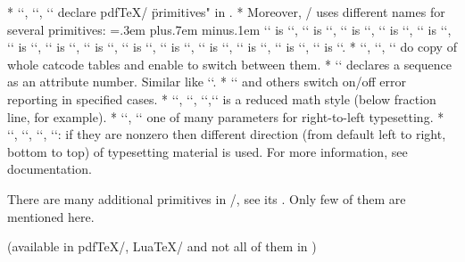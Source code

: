 {\begitems
* \x`\pdffeedback`, \x`\pdfextension`, \x`\pdfvariable` declare pdf\TeX/ 
  \"primitives" in \LuaTeX.
* Moreover, \LuaTeX/ uses different names for several primitives:
  {\spaceskip=.3em plus.7em minus.1em
  \x`\pagewidth` is \q`\pdfpagewidth`,
  \x`\pageheight` is \q`\pdfpageheight`,
  \x`\outputmode` is \q`\pdfoutput`,
  \x`\savepos` is \q`\pdfsavepos`,
  \x`\lastxpos` is \q`\pdflastxpos`,
  \x`\lastypos` is \q`\pdflastypos`,
  \x`\outputmode` is \q`\pdfoutput`,
  \x`\saveimageresource` is \q`\pdfximage`,
  \x`\lastsavedimageresourceindex` is \q`\pdflastximage`,
  \x`\useimageresource` is \q`\pdfrefximage`,
  \x`\protrudechars` is \q`\pdfprotrudechars`,
  \x`\normaldeviate` is \q`\pdfnormaldeviate`,
  \x`\uniformdeviate` is \q`\pdfuniformdeviate`,
  \x`\setrandomseed` is \q`\pdfsetrandomseed`.
  }
* \x`\catcodetable`, \x`\initcatcodetable`, \x`\savecatcodetable`
  do copy of whole catcode tables and enable to switch between them.
* \x`\attributedef` declares a sequence as an attribute number. Similar like
  \q`\countdef`.
* \x`\suppressfontnotfounderror` and others switch on/off
  error reporting in specified cases. 
* \x`\crampeddisplaystyle`, \x`\crampedtextstyle`,
  \x`\crampedscriptstyle`,\nl \x`\crampedscriptscriptstyle`
  is a reduced math style (below fraction line, for example).
* \x`\matheqdirmode`, \x`\breakafterdirmode` one of many parameters for
  right-to-left typesetting.
* \x`\textdirection`, \x`\pardirection`, \x`\bodydirection`, \x`\pagedirection`:
  if they are nonzero then different direction (from default left to right,
  bottom to top) of typesetting material is used.
  For more information, see
   documentation.
\enditems

There are many additional primitives in \LuaTeX/, see its
.
Only few of them are mentioned here.
\medskip

(available in pdf\TeX/, Lua\TeX/ and not all of them in \XeTeX)

}

